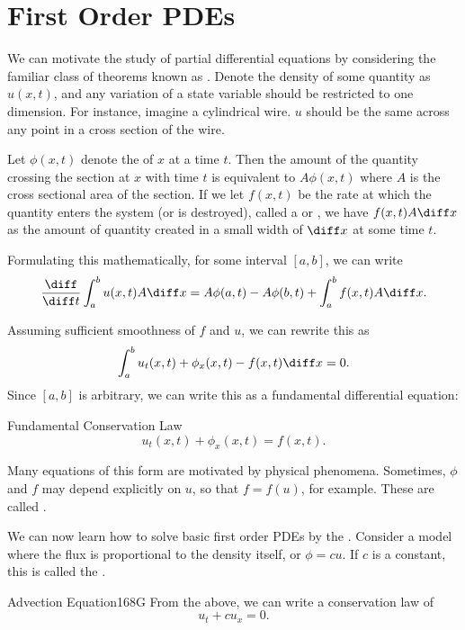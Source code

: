 \section{First Order PDEs}

We can motivate the study of partial differential equations by considering the familiar class of theorems known as . Denote the density of some quantity as $u(x,t)$, and any variation of a state variable should be restricted to one dimension. For instance, imagine a cylindrical wire. $u$ should be the same across any point in a cross section of the wire.

Let $\phi(x,t)$ denote the  of $x$ at a time $t$. Then the amount of the quantity crossing the section at $x$ with time $t$ is equivalent to $A\phi(x,t)$ where $A$ is the cross sectional area of the section. If we let $f(x,t)$ be the rate at which the quantity enters the system (or is destroyed), called a  or , we have $f(x,t)A \diff x$ as the amount of quantity created in a small width of $\diff x$ at some time $t$. 

Formulating this mathematically, for some interval $[a,b]$, we can write 
\[ \frac{\diff}{\diff t} \int_a^b u(x,t)A \diff x = A\phi(a,t) - A\phi(b,t) + \int_a^b f(x,t)A\diff x. \] 

Assuming sufficient smoothness of $f$ and $u$, we can rewrite this as 
\[ \int_a^b u_t(x,t) + \phi_x(x,t) - f(x,t) \diff x = 0. \] Since $[a,b]$ is arbitrary, we can write this as a fundamental differential equation: 
\begin{definition}{Fundamental Conservation Law}{}
\[ u_t(x,t) + \phi_x(x,t) = f(x,t). \] 
\end{definition}

Many equations of this form are motivated by physical phenomena. Sometimes, $\phi$ and $f$ may depend explicitly on $u$, so that $f = f(u)$, for example. These are called . 

We can now learn how to solve basic first order PDEs by the . 
Consider a model where the flux is proportional to the density itself, or $\phi = cu$. If $c$ is a constant, this is called the . 
\begin{definition}{Advection Equation}{168G}
From the above, we can write a conservation law of 
\[ u_t + cu_x = 0. \] 
\end{definition}


